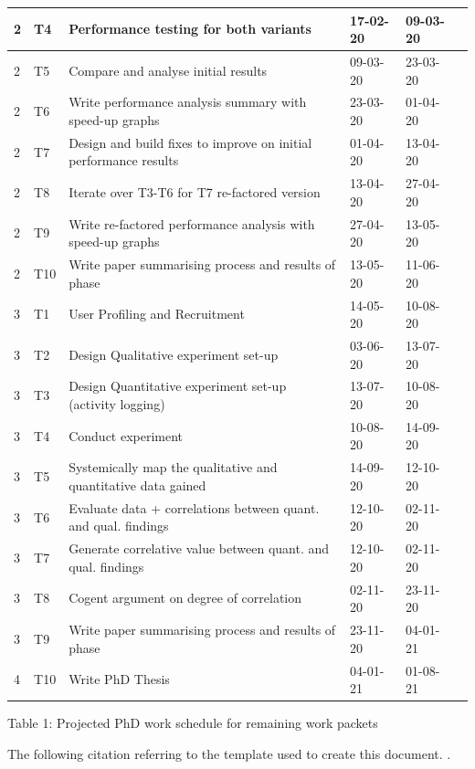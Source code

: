 \documentclass[12pt]{article}
\begin{document}
\begin{center}
\begin{tabular}{ | l | l | l | l | l | p{10cm} |}
       \\ \hline
             \colorbox{green!30}{2} & T4 & Performance testing for both variants & 17-02-20 & 09-03-20
       \\ \hline
         \colorbox{green!30}{2} & T5 & Compare and analyse initial results & 09-03-20 & 23-03-20
           \\ \hline
         \colorbox{green!30}{2} & T6 & Write performance analysis summary with speed-up graphs & 23-03-20 & 01-04-20
       \\ \hline
       \colorbox{green!30}{2} & T7 & Design and build fixes to improve on initial performance results & 01-04-20 & 13-04-20
       \\ \hline
        \colorbox{green!30}{2} & T8 & Iterate over T3-T6 for T7 re-factored version & 13-04-20 & 27-04-20
           \\ \hline
            \colorbox{green!30}{2} & T9 & Write re-factored performance analysis with speed-up graphs & 27-04-20 & 13-05-20
       \\ \hline
        \colorbox{green!30}{2} & T10 & Write paper summarising process and results of phase & 13-05-20 & 11-06-20
       \\ \hline
    \colorbox{orange!30}{3} & T1 & User Profiling and Recruitment & 14-05-20 & 10-08-20
       \\ \hline
       \colorbox{orange!30}{3} & T2 & Design Qualitative experiment set-up & 03-06-20 & 13-07-20
       \\ \hline
         \colorbox{orange!30}{3} & T3 & Design Quantitative experiment set-up (activity logging) & 13-07-20 & 10-08-20
       \\ \hline
         \colorbox{orange!30}{3} & T4 & Conduct experiment & 10-08-20 & 14-09-20
       \\ \hline
         \colorbox{orange!30}{3} & T5 & Systemically map the qualitative and quantitative data gained  & 14-09-20 & 12-10-20
       \\ \hline
        \colorbox{orange!30}{3} & T6 & Evaluate data + correlations between quant. and qual. findings  & 12-10-20 & 02-11-20
       \\ \hline
       \colorbox{orange!30}{3} & T7 & Generate correlative value between quant. and qual. findings  & 12-10-20 & 02-11-20
       \\ \hline
       \colorbox{orange!30}{3} & T8 & Cogent argument on degree of correlation  & 02-11-20 & 23-11-20
       \\ \hline
       \colorbox{orange!30}{3} & T9 & Write paper summarising process and results of phase &  23-11-20 & 04-01-21
       \\ \hline
   \colorbox{gray!30}{4} & T10 & Write PhD Thesis  & 04-01-21 & 01-08-21
    \\ \hline
    \end{tabular}
    Table 1: Projected PhD work schedule for remaining work packets
\end{center}
The following citation referring to the template used to create this document. \cite{Gil:02}.


\end{document}
